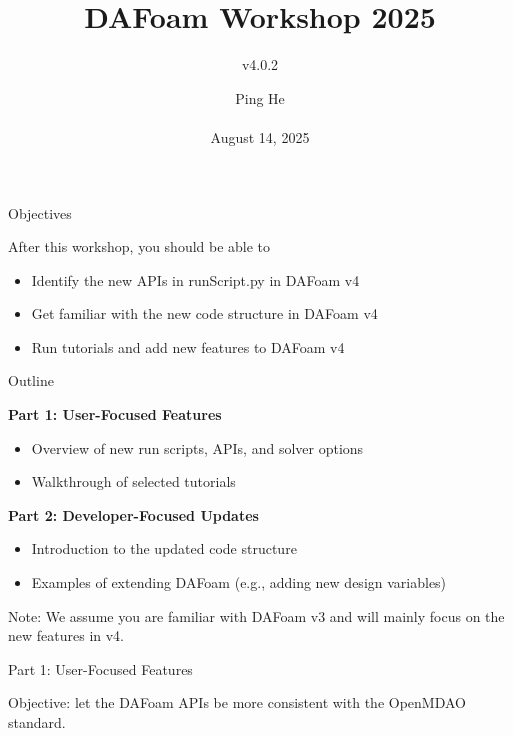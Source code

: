 \documentclass{bredelebeamer}
\title[ ]{DAFoam Workshop 2025}
\subtitle{v4.0.2}
\author{Ping He\\ ~ \\August 14, 2025 }
\date[August 14, 2025]{}
\begin{document}
\begin{frame}
  \titlepage
\end{frame}



\begin{frame}{Objectives}

After this workshop, you should be able to
\begin{itemize}
  \setlength\itemsep{1em}
 \item Identify the new APIs in runScript.py in DAFoam v4
 \item Get familiar with the new code structure in DAFoam v4 
 \item Run tutorials and add new features to DAFoam v4
\end{itemize} 

\end{frame}


\begin{frame}{Outline}

\textbf{Part 1: User-Focused Features}
\begin{itemize}
  \setlength\itemsep{1em}
 \item Overview of new run scripts, APIs, and solver options
 \item Walkthrough of selected tutorials
\end{itemize}

\textbf{Part 2: Developer-Focused Updates}
\begin{itemize}
  \setlength\itemsep{1em}
 \item Introduction to the updated code structure
 \item Examples of extending DAFoam (e.g., adding new design variables)
\end{itemize}

Note: We assume you are familiar with DAFoam v3 and will mainly focus on the new features in v4. 

\end{frame}

\begin{frame}{}

  \begin{center}
     \noindent \Large{Part 1: User-Focused Features}
  \end{center}

  \begin{center}
    \noindent \large{Objective: let the DAFoam APIs be more consistent with the OpenMDAO standard.}
 \end{center}
  
  \end{frame}
\end{document}
